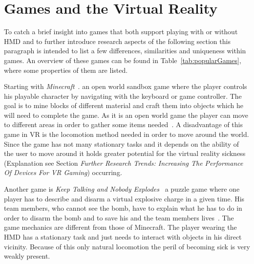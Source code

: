 
\section{Games and the Virtual Reality}
\label{sec:gamesNvr}

To catch a brief insight into games that both support playing with or without HMD and to further introduce research aspects of the following section this paragraph is intended to list a few differences, similarities and uniqueness within games. An overview of these games can be found in Table~\ref{tab:popularGames}, where some properties of them are listed. 

Starting with \textit{Minecraft}~\cite{game:minecraft}. an open world sandbox game where the player controls his playable character by navigating with the keyboard or game controller. The goal is to mine blocks of different material and craft them into objects which he will need to complete the game. As it is an open world game the player can move to different areas in order to gather some items needed~\cite{game:minecraft}. \newline
A disadvantage of this game in VR is the locomotion method needed in order to move around the world. Since the game has not many stationary tasks and it depends on the ability of the user to move around it holds greater potential for the virtual reality sickness (Explanation see Section \textit{Further Research Trends: Increasing The Performance Of Devices For VR Gaming}) occurring.

Another game is \textit{Keep Talking and Nobody Explodes}~\cite{game:keepTalking} a puzzle game where one player has to describe and disarm a virtual explosive charge in a given time. His team members, who cannot see the bomb, have to explain what he has to do in order to disarm the bomb and to save his and the team members lives~\cite{game:keepTalking}. The game mechanics are different from those of Minecraft. The player wearing the HMD has a stationary task and just needs to interact with objects in his direct vicinity. \newline
Because of this only natural locomotion the peril of becoming sick is very weakly present.

